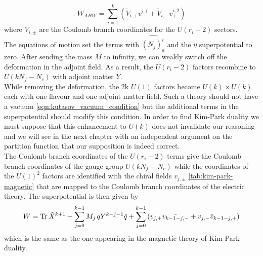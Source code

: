 \begin{equation}
W_{AHW} = \sum_{i=1}^k \left( \tilde{V}_{i,+} {v}^{i,1}_- + \tilde{V}_{i,-} {v}^{i,2}_+   \right)
\end{equation}
where $V_{i,\pm}$ are the Coulomb branch coordinates for the $U(r_i-2)$ sectors.\\
The equations of motion set the terms with $\hat{ (N_j)_a^i}$ and the $\eta$ superpotential to zero.
After sending the mass $M$ to infinity, we can weakly switch off the deformation in the adjoint field. 
As a result, the $U(r_i-2)$ factors recombine to $U(k N_f - N_c)$ with adjoint matter $Y$.\\
While removing the deformation, the 2k $U(1)$ factors become $U(k) \times U(k)$ each with one flavour and one adjoint matter field. 
Such a theory should not have a vacuum \eqref{eqn:kutasov_vacuum_condition} but the additional terms in the superpotential should modify this condition.
In order to find Kim-Park duality we must suppose that this enhancement to $U(k)$ does not invalidate our reasoning and we will see in the next chapter with an independent argument on the partition function that our supposition is indeed correct.\\
The Coulomb branch coordinates of the $U(r_i-2)$ terms give the Coulomb branch coordinates of the gauge group $U(k N_f -N_c)$ while the coordinates of the $U(1)^2$ factors are identified with the chiral fields $v_{j,\pm}$ \eqref{tab:kim-park-magnetic} that are mapped to the Coulomb branch coordinates of the electric theory.
The superpotential is then given by
\begin{equation}
W = \mathrm{Tr } \,{\tilde{X}^{k+1}} + \sum_{j=0}^{k-1} M_j \, q Y^{k-j-1} \tilde{q} + \sum_{j=0}^{k-1} \left(  v_{j,+} \tilde{v_{k-1-j,-}} + v_{j,-} \tilde{v}_{k-1-j,+} \right)
\end{equation}
 which is the same as the one appearing in the magnetic theory of Kim-Park duality.











